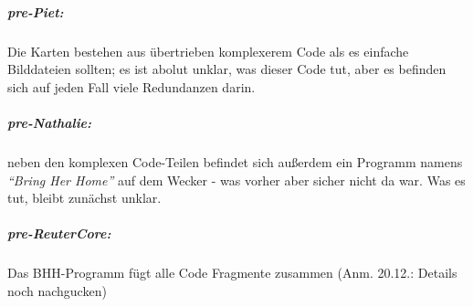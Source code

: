 \subparagraph{pre-Piet:} Die Karten bestehen aus übertrieben komplexerem Code als es einfache Bilddateien sollten; es ist abolut unklar, was dieser Code tut, aber es befinden sich auf jeden Fall viele Redundanzen darin.

\subparagraph{pre-Nathalie:} neben den komplexen Code-Teilen befindet sich außerdem ein Programm namens \textit{``Bring Her Home''} auf dem Wecker - was vorher aber sicher nicht da war. Was es tut, bleibt zunächst unklar.

\subparagraph{pre-ReuterCore:} Das BHH-Programm fügt alle Code Fragmente zusammen (Anm. 20.12.: Details noch nachgucken)
